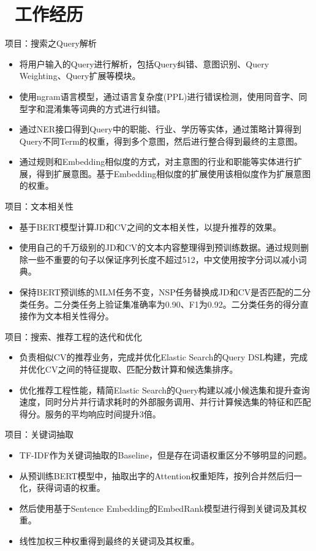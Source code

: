 \documentclass{resume}
\begin{document}
\section{\faUsers\ 工作经历}

项目：搜索之Query解析
\begin{itemize}
  \item 将用户输入的Query进行解析，包括Query纠错、意图识别、Query Weighting、Query扩展等模块。
 \item 使用ngram语言模型，通过语言复杂度(PPL)进行错误检测，使用同音字、同型字和混淆集等词典的方式进行纠错。
 \item 通过NER接口得到Query中的职能、行业、学历等实体，通过策略计算得到Query不同Term的权重，得到多个意图，然后进行整合得到最终的主意图。
 \item 通过规则和Embedding相似度的方式，对主意图的行业和职能等实体进行扩展，得到扩展意图。基于Embedding相似度的扩展使用该相似度作为扩展意图的权重。
\end{itemize}

项目：文本相关性
\begin{itemize}
  \item 基于BERT模型计算JD和CV之间的文本相关性，以提升推荐的效果。
  \item 使用自己的千万级别的JD和CV的文本内容整理得到预训练数据。通过规则删除一些不重要的句子以保证序列长度不超过512，中文使用按字分词以减小词典。
  \item 保持BERT预训练的MLM任务不变，NSP任务替换成JD和CV是否匹配的二分类任务。二分类任务上验证集准确率为0.90、F1为0.92。二分类任务的得分直接作为文本相关性得分。
\end{itemize}

项目：搜索、推荐工程的迭代和优化
\begin{itemize}
  \item 负责相似CV的推荐业务，完成并优化Elastic Search的Query DSL构建，完成并优化CV之间的特征提取、匹配分数计算和候选集排序。
  \item 优化推荐工程性能，精简Elastic Search的Query构建以减小候选集和提升查询速度，同时分片并行请求耗时的外部服务调用、并行计算候选集的特征和匹配得分。服务的平均响应时间提升3倍。
\end{itemize}

项目：关键词抽取
\begin{itemize}
 \item TF-IDF作为关键词抽取的Baseline，但是存在词语权重区分不够明显的问题。
  \item 从预训练BERT模型中，抽取出字的Attention权重矩阵，按列合并然后归一化，获得词语的权重。
  \item 然后使用基于Sentence Embedding的EmbedRank模型进行得到关键词及其权重。
  \item 线性加权三种权重得到最终的关键词及其权重。
\end{itemize}
\end{document}
